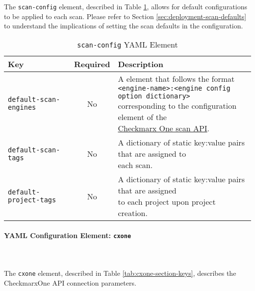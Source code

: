 \noindent\\\\The \texttt{scan-config} element, described in Table \ref{tab:scan-config-section-keys}, allows for
default configurations to be applied to each scan.  Please refer to
Section \ref{sec:deployment-scan-defaults} to understand the implications of setting
the scan defaults in the \cxoneflow configuration.



\begin{table}[ht]
    \caption{\texttt{scan-config} YAML Element}  
    \label{tab:scan-config-section-keys}      
    \begin{tabularx}{\textwidth}{lcl}
        \toprule
        \textbf{Key} & \textbf{Required} & \textbf{Description}\\
        \midrule
        \texttt{default-scan-engines} & No & \makecell[l]{A element that follows the format\\\texttt{<engine-name>:<engine config option dictionary>}\\corresponding to the configuration element of the\\\href{https://checkmarx.stoplight.io/docs/checkmarx-one-api-reference-guide/branches/main/f601dd9456e80-run-a-scan}{Checkmarx One scan API}.}\\
        \midrule
        \texttt{default-scan-tags} & No &  \makecell[l]{A dictionary of static key:value pairs that are assigned to\\each scan.}\\
        \midrule
        \texttt{default-project-tags} & No & \makecell[l]{A dictionary of static key:value pairs that are assigned\\to each project upon project creation.}\\
        \bottomrule
    \end{tabularx}
\end{table}


\paragraph{YAML Configuration Element: \texttt{cxone} }\label{sec:cxone-element}

\noindent\\\\The \texttt{cxone} element, described in Table \ref{tab:cxone-section-keys}, 
describes the CheckmarxOne API connection parameters.


